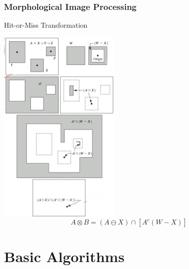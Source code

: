 \documentclass{beamer}
\begin{document}
\begin{frame}
\frametitle{Morphological Image Processing}
\begin{block}{Hit-or-Miss Transformation}\scriptsize
  \begin{center}
    \includegraphics[height=0.5\textheight]{images/hit-miss.png}
    $$A \otimes B = (A \ominus X) \cap \left[A^c (W - X) \right]$$
  \end{center}
\end{block}
\end{frame}

\section{Basic Algorithms}

\end{document}
